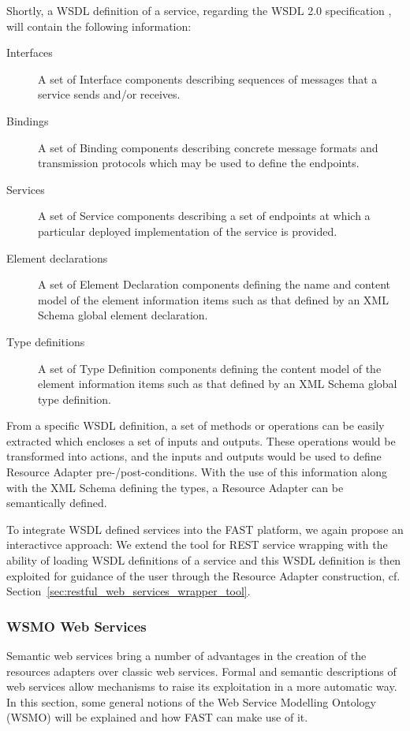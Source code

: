 \documentclass{fast_latex}
\begin{document}
Shortly, a WSDL definition of a service, regarding the WSDL 2.0 specification \cite{WSDL2.0}, will contain the following information:
\begin{description}
	\item[Interfaces] A set of Interface components describing sequences of messages that a service sends and/or receives.
	\item[Bindings] A set of Binding components describing concrete message formats and transmission protocols which may be used to define the endpoints.
	\item[Services] A set of Service components describing a set of endpoints at which a particular deployed implementation of the service is provided.
	\item[Element declarations] A set of Element Declaration components defining the name and content model of the element information items such as that defined by an XML Schema global element declaration.
	\item[Type definitions] A set of Type Definition components defining the content model of the element information items such as that defined by an XML Schema global type definition.
\end{description}

From a specific WSDL definition, a set of methods or operations can be easily extracted which encloses a set of inputs and outputs. These operations would be transformed into actions, and the inputs and outputs would be used to define Resource Adapter pre-/post-conditions. With the use of this information along with the XML Schema defining the types, a Resource Adapter can be semantically defined.

To integrate WSDL defined services into the FAST platform, we again propose an interactivce approach: We extend the tool for REST service wrapping with the ability of loading WSDL definitions of a service and this WSDL definition is then exploited for guidance of the user through the Resource Adapter construction, cf. Section~\ref{sec:restful_web_services_wrapper_tool}.


\subsubsection{WSMO Web Services} %
\label{ssub:wsmo_web_services}

Semantic web services bring a number of advantages in the creation of the resources adapters over classic web services. Formal and semantic descriptions of web services allow mechanisms to raise its exploitation in a more automatic way. In this section, some general notions of the Web Service Modelling Ontology (WSMO) will be explained and how FAST can make use of it.
\end{document}
